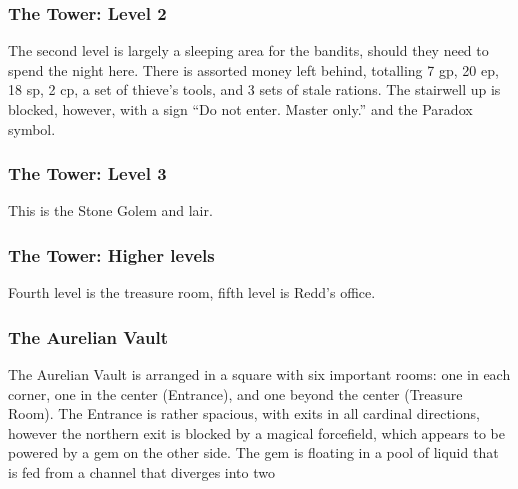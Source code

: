 \subsubsection{The Tower: Level 2}

The second level is largely a sleeping area for the bandits, should they need to spend the night here. There is assorted money left behind, totalling 7 gp, 20 ep, 18 sp, 2 cp, a set of thieve's tools, and 3 sets of stale rations. The stairwell up is blocked, however, with a sign ``Do not enter. Master only.'' and the Paradox symbol.

\subsubsection{The Tower: Level 3}
This is the Stone Golem and lair.


\subsubsection{The Tower: Higher levels}
Fourth level is the treasure room, fifth level is Redd's office.

\subsubsection{The Aurelian Vault}

The Aurelian Vault is arranged in a square with six important rooms: one in each corner, one in the center (Entrance), and one beyond the center (Treasure Room). The Entrance is rather spacious, with exits in all cardinal directions, however the northern exit is blocked by a magical forcefield, which appears to be powered by a gem on the other side. The gem is floating in a pool of liquid that is fed from a channel that diverges into two 